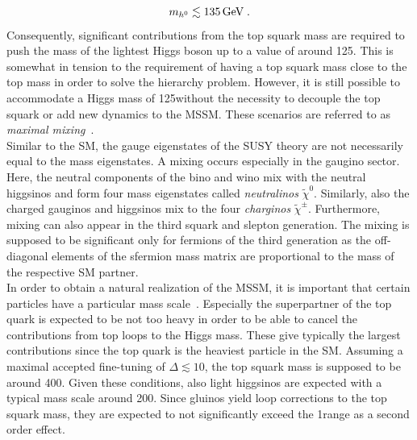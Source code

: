 \begin{equation*}
m_{h^0} \lesssim 135 \,\text{Ge}\kern-0.06667em\text{V} \; .
\end{equation*}
Consequently, significant contributions from the top squark mass are required to push the mass of the lightest Higgs boson up to a value of around 125\gev. This is somewhat in tension to the requirement of having a top squark mass close to the top mass in order to solve the hierarchy problem. However, it is still possible to accommodate a Higgs mass of 125\gev without the necessity to decouple the top squark or add new dynamics to the MSSM. These scenarios are referred to as \textit{maximal mixing}~\cite{Djouadi:2005gj}. \\
Similar to the SM, the gauge eigenstates of the SUSY theory are not necessarily equal to the mass eigenstates. A mixing occurs especially in the gaugino sector. Here, the neutral components of the bino and wino mix with the neutral higgsinos and form four mass eigenstates called \textit{neutralinos} $\tilde{\chi}^0$. Similarly, also the charged gauginos and higgsinos mix to the four \textit{charginos} $\tilde{\chi}^{\pm}$. Furthermore, mixing can also appear in the third squark and slepton generation. The mixing is supposed to be significant only for fermions of the third generation as the off-diagonal elements of the sfermion mass matrix are proportional to the mass of the respective SM partner. \\
In order to obtain a natural realization of the MSSM, it is important that certain particles have a particular mass scale~\cite{Craig:2013cxa}. Especially the superpartner of the top quark is expected to be not too heavy in order to be able to cancel the contributions from top loops to the Higgs mass. These give typically the largest contributions since the top quark is the heaviest particle in the SM. Assuming a maximal accepted fine-tuning of $\Delta \lesssim 10$, the top squark mass is supposed to be around 400\gev. Given these conditions, also light higgsinos are expected with a typical mass scale around 200\gev. Since gluinos yield loop corrections to the top squark mass, they are expected to not significantly exceed the 1\tev range as a second order effect. 


